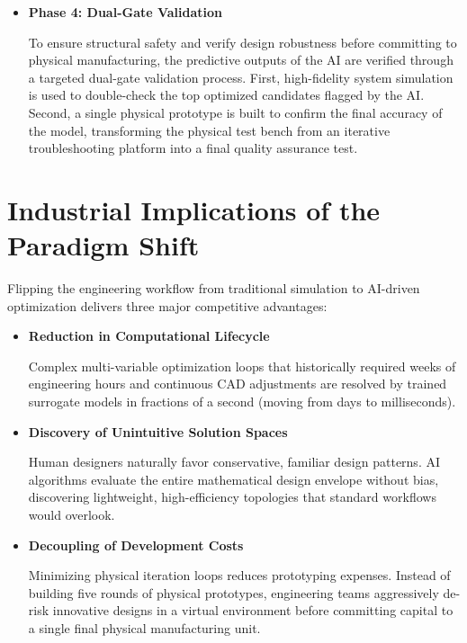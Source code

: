 \begin{itemize}
                numerical simulations, predicting the performance of new configurations in milliseconds 
                and enabling real-time exploration of the design space.
            \item \textbf{Phase 4: Dual-Gate Validation}\par
                To ensure structural safety and verify design robustness before committing to physical 
                manufacturing, the predictive outputs of the AI are verified through a targeted 
                dual-gate validation process. First, high-fidelity system simulation is used to 
                double-check the top optimized candidates flagged by the AI. Second, a single physical 
                prototype is built to confirm the final accuracy of the model, transforming the physical 
                test bench from an iterative troubleshooting platform into a final quality assurance test.
        \end{itemize}

\section{Industrial Implications of the Paradigm Shift}
    Flipping the engineering workflow from traditional simulation to AI-driven optimization delivers 
    three major competitive advantages:
        \begin{itemize}
            \item \textbf{Reduction in Computational Lifecycle}\par
                Complex multi-variable optimization loops that historically required weeks of 
                engineering hours and continuous CAD adjustments are resolved by trained surrogate 
                models in fractions of a second (moving from days to milliseconds).
            \item \textbf{Discovery of Unintuitive Solution Spaces}\par
                Human designers naturally favor conservative, familiar design patterns. AI algorithms 
                evaluate the entire mathematical design envelope without bias, discovering 
                lightweight, high-efficiency topologies that standard workflows would overlook.
            \item \textbf{Decoupling of Development Costs}\par
                Minimizing physical iteration loops reduces prototyping expenses. Instead of building 
                five rounds of physical prototypes, engineering teams aggressively de-risk innovative 
                designs in a virtual environment before committing capital to a single final physical 
                manufacturing unit.
        \end{itemize}